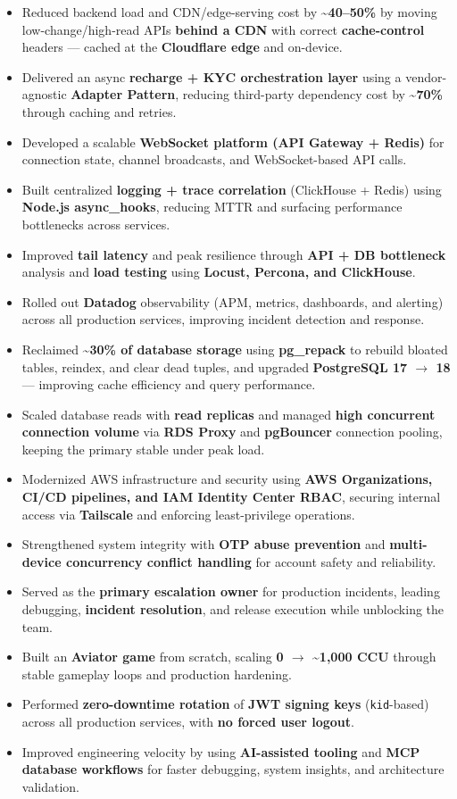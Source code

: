 \documentclass[a4paper,10pt]{article}
\begin{document}
\begin{itemize}
  \item Reduced backend load and CDN/edge-serving cost by \textbf{\textasciitilde{}40--50\%} by moving low-change/high-read APIs \textbf{behind a CDN} with correct \textbf{cache-control} headers --- cached at the \textbf{Cloudflare edge} and on-device.
  \item Delivered an async \textbf{recharge + KYC orchestration layer} using a vendor-agnostic \textbf{Adapter Pattern}, reducing third-party dependency cost by \textbf{\textasciitilde{}70\%} through caching and retries.
  \item Developed a scalable \textbf{WebSocket platform (API Gateway + Redis)} for connection state, channel broadcasts, and WebSocket-based API calls.
  \item Built centralized \textbf{logging + trace correlation} (ClickHouse + Redis) using \textbf{Node.js async\_hooks}, reducing MTTR and surfacing performance bottlenecks across services.
  \item Improved \textbf{tail latency} and peak resilience through \textbf{API + DB bottleneck} analysis and \textbf{load testing} using \textbf{Locust, Percona, and ClickHouse}.
  \item Rolled out \textbf{Datadog} observability (APM, metrics, dashboards, and alerting) across all production services, improving incident detection and response.
  \item Reclaimed \textbf{\textasciitilde{}30\% of database storage} using \textbf{pg\_repack} to rebuild bloated tables, reindex, and clear dead tuples, and upgraded \textbf{PostgreSQL 17 $\rightarrow$ 18} --- improving cache efficiency and query performance.
  \item Scaled database reads with \textbf{read replicas} and managed \textbf{high concurrent connection volume} via \textbf{RDS Proxy} and \textbf{pgBouncer} connection pooling, keeping the primary stable under peak load.
  \item Modernized AWS infrastructure and security using \textbf{AWS Organizations, CI/CD pipelines, and IAM Identity Center RBAC}, securing internal access via \textbf{Tailscale} and enforcing least-privilege operations.
  \item Strengthened system integrity with \textbf{OTP abuse prevention} and \textbf{multi-device concurrency conflict handling} for account safety and reliability.
  \item Served as the \textbf{primary escalation owner} for production incidents, leading debugging, \textbf{incident resolution}, and release execution while unblocking the team.
  \item Built an \textbf{Aviator game} from scratch, scaling \textbf{0 $\rightarrow$ \textasciitilde{}1,000 CCU} through stable gameplay loops and production hardening.
  \item Performed \textbf{zero-downtime rotation} of \textbf{JWT signing keys} (\texttt{kid}-based) across all production services, with \textbf{no forced user logout}.
  \item Improved engineering velocity by using \textbf{AI-assisted tooling} and \textbf{MCP database workflows} for faster debugging, system insights, and architecture validation.
\end{itemize}
\end{document}
